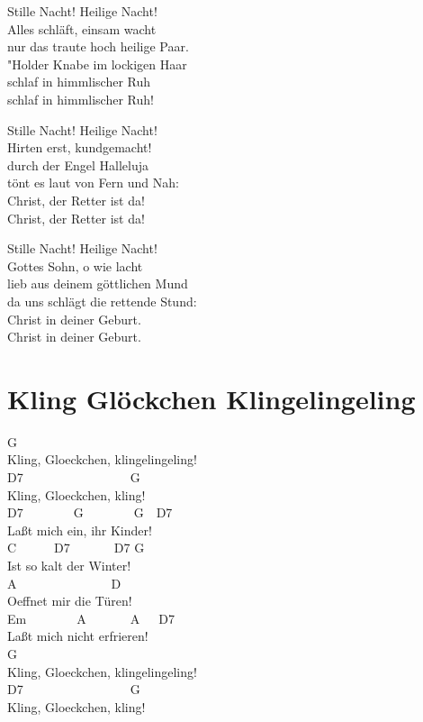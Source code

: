 \documentclass[
  letterpaper,
  twoside=false]{scrbook}
\begin{document}
Stille Nacht! Heilige Nacht!\\
Alles schläft, einsam wacht\\
nur das traute hoch heilige Paar.\\
"Holder Knabe im lockigen Haar\\
schlaf in himmlischer Ruh\textquotesingle{}\\
schlaf in himmlischer Ruh\textquotesingle!

Stille Nacht! Heilige Nacht!\\
Hirten erst, kundgemacht!\\
durch der Engel Halleluja\\
tönt es laut von Fern\textquotesingle{} und Nah:\\
Christ, der Retter ist da!\\
Christ, der Retter ist da!

Stille Nacht! Heilige Nacht!\\
Gottes Sohn, o wie lacht\\
lieb\textquotesingle{} aus deinem göttlichen Mund\\
da uns schlägt die rettende Stund\textquotesingle:\\
Christ in deiner Geburt.\\
Christ in deiner Geburt.

\hypertarget{kling-gluxf6ckchen-klingelingeling}{%
\chapter{Kling Glöckchen
Klingelingeling}\label{kling-gluxf6ckchen-klingelingeling}}

G\\
Kling, Gloeckchen, klingelingeling!\\
D7~~~~~~~~~~~~~~~~~G\\
Kling, Gloeckchen, kling!\\
D7~~~~~~~~G~~~~~~~~G~~D7\\
Laßt mich ein, ihr Kinder!\\
C~~~~~~D7~~~~~~~D7 G\\
Ist so kalt der Winter!\\
A~~~~~~~~~~~~~~~D\\
Oeffnet mir die Türen!\\
Em~~~~~~~~A~~~~~~~A~~~D7\\
Laßt mich nicht erfrieren!\\
G\\
Kling, Gloeckchen, klingelingeling!\\
D7~~~~~~~~~~~~~~~~~G\\
Kling, Gloeckchen, kling!~~
\end{document}
